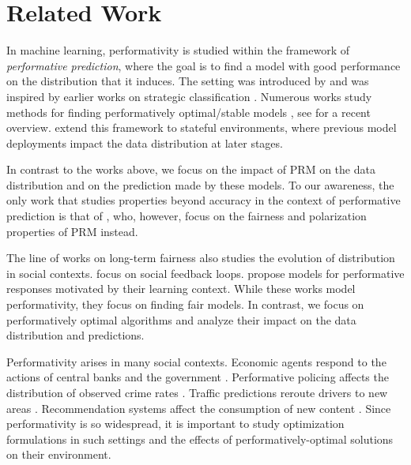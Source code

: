 \section{Related Work}
 In machine learning, performativity is studied within the framework of
\emph{performative prediction}, where the goal is to find a model with good
performance on the distribution that it induces. The setting was introduced by
\citet{p20p} and was inspired by earlier works on strategic classification
\citep{h16s,d04a}. Numerous works study methods for finding performatively
optimal/stable models \citep{mendler2020stochastic,%
izzo2022learn,ray2022decision, %
lin2024plugin}, see \citet{hardt2023performative} for a recent overview.
\citet{b22p,r22d} extend this framework to stateful
environments, where previous model deployments impact the data distribution at
later stages.

In contrast to the works above, we focus on the impact of PRM on the data distribution and on the prediction made by these models. To our awareness, the only work that studies properties beyond accuracy in the context of performative prediction is that of \citet{jin2024addressing}, who, however, focus on the
fairness and polarization properties of PRM instead.

 The line of works on long-term fairness also studies the evolution of
distribution in social contexts. \citet{ensign2018runaway,bechavod2019equal}
focus on social feedback loops. \citet{williams2019dynamic, liu2020disparate}
propose models for performative responses motivated by their learning context.
While these works model performativity, they focus on finding fair models. In
contrast, we focus on performatively optimal algorithms and analyze their
impact on the data distribution and predictions. 

 Performativity arises in many social contexts. Economic agents respond to the
actions of central banks and the government \citep{l76e}. Performative policing
affects the distribution of observed crime rates \citep{e18r}. Traffic
predictions reroute drivers to new areas \citep{m19w,c22i}. Recommendation
systems affect the consumption of new content \citep{b22d,d22p}. Since performativity is so widespread, it is important to study optimization formulations in such settings and the effects of performatively-optimal solutions on their environment.